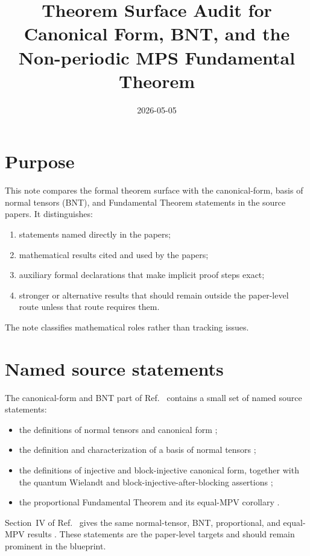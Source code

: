\documentclass{article}
\title{Theorem Surface Audit for Canonical Form, BNT, and the Non-periodic MPS Fundamental Theorem}
\author{}
\date{2026-05-05}
\begin{document}
\maketitle
{}

\section{Purpose}

This note compares the formal theorem surface with the canonical-form, basis of
normal tensors (BNT), and Fundamental Theorem statements in the source papers.
It distinguishes:
\begin{enumerate}
    \item statements named directly in the papers;
    \item mathematical results cited and used by the papers;
    \item auxiliary formal declarations that make implicit proof steps exact;
    \item stronger or alternative results that should remain outside the
          paper-level route unless that route requires them.
\end{enumerate}
The note classifies mathematical roles rather than tracking issues.

\section{Named source statements}

The canonical-form and BNT part of Ref.~\cite{Cirac2016MPDO_arXiv} contains a
small set of named source statements:
\begin{itemize}
    \item the definitions of normal tensors and canonical form
          \cite[lines~233--255]{Cirac2016MPDO_arXiv};
    \item the definition and characterization of a basis of normal tensors
          \cite[lines~271--280]{Cirac2016MPDO_arXiv};
    \item the definitions of injective and block-injective canonical form,
          together with the quantum Wielandt and
          block-injective-after-blocking assertions
          \cite[lines~317--345]{Cirac2016MPDO_arXiv};
    \item the proportional Fundamental Theorem and its equal-MPV corollary
          \cite[lines~347--356]{Cirac2016MPDO_arXiv}.
\end{itemize}
Section~IV of Ref.~\cite{Cirac2021Matrix} gives the same normal-tensor, BNT,
proportional, and equal-MPV results
\cite[lines~1828--1899]{Cirac2021Matrix}. These statements are the
paper-level targets and should remain prominent in the blueprint.
\end{document}
